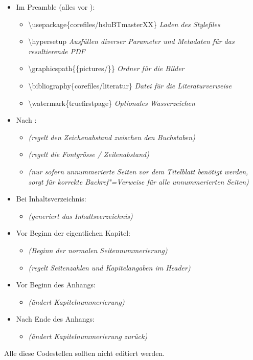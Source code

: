 \begin{itemize}%
\item Im Preamble (alles vor ):%
\begin{itemize}%
\item \textbackslash usepackage\{corefiles/hsluBTmasterXX\} \textit{Laden des Stylefiles}%
\item \textbackslash hypersetup \textit{Ausfüllen diverser Parameter und Metadaten für das resultierende PDF}%
\item \textbackslash graphicspath\{\{pictures/\}\}   \textit{Ordner für die Bilder}  %
\item \textbackslash bibliography\{corefiles/literatur\} \textit{Datei für die Literaturverweise} %
\item \textbackslash watermark\{truefirstpage\} \textit{Optionales Wasserzeichen }%
\end{itemize}%
\item Nach :%
\begin{itemize}%
\item {}  \textit{(regelt den Zeichenabstand zwischen den Buchstaben)}%
\item {} \textit{(regelt die Fontgrösse / Zeilenabstand)}%
\item {} \textit{(nur sofern unnummerierte Seiten vor dem Titelblatt benötigt werden, sorgt für korrekte Backref"=Verweise für alle unnummerierten Seiten)}%
\end{itemize}%
%
\item Bei Inhaltsverzeichnis:%
\begin{itemize}%
\item {} \textit{(generiert das Inhaltsverzeichnis)}%
\end{itemize}%
\item Vor Beginn der eigentlichen Kapitel:%
\begin{itemize}%
\item {} \textit{(Beginn der normalen Seitennummerierung)}%
\item {} \textit{(regelt Seitenzahlen und Kapitelangaben im Header)}%
\end{itemize}%
%
\item Vor Beginn des Anhangs:%
\begin{itemize}%
\item {} \textit{(ändert Kapitelnummerierung)}%
\end{itemize}%
%
\item Nach Ende des Anhangs:%
\begin{itemize}%
\item {} \textit{(ändert Kapitelnummerierung zurück)}%
\end{itemize}%
\end{itemize}%
%
Alle diese Codestellen sollten nicht editiert werden.%
%
